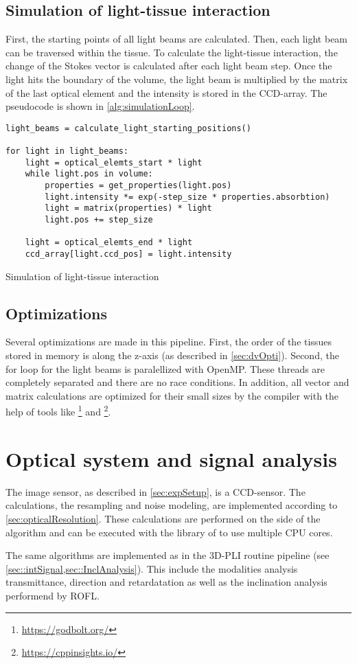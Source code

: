 \subsection{Simulation of light-tissue interaction}
%
First, the starting points of all light beams are calculated.
Then, each light beam can be traversed within the tissue.
To calculate the light-tissue interaction, the change of the Stokes vector is calculated after each light beam step.
Once the light hits the boundary of the volume, the light beam is multiplied by the matrix of the last optical element and the intensity is stored in the \ac{CCD}-array.
The pseudocode is shown in \cref{alg:simulationLoop}.
%
\begin{lstfloat}[!tb]
\lstset{style=python}
\begin{lstlisting}[]
light_beams = calculate_light_starting_positions()

for light in light_beams:
    light = optical_elemts_start * light
    while light.pos in volume:
        properties = get_properties(light.pos)
        light.intensity *= exp(-step_size * properties.absorbtion)
        light = matrix(properties) * light
        light.pos += step_size
   
    light = optical_elemts_end * light
    ccd_array[light.ccd_pos] = light.intensity
\end{lstlisting}
\caption{Simulation of light-tissue interaction}
\label{alg:simulationLoop}
\end{lstfloat}
%
%
%
\subsection{Optimizations}
%
Several optimizations are made in this pipeline.
First, the order of the tissues stored in memory is along the z-axis (as described in \cref{sec:dvOpti}).
Second, the for loop for the light beams is paralellized with \ac{OpenMP}.
These threads are completely separated and there are no race conditions.
In addition, all vector and matrix calculations are optimized for their small sizes by the compiler with the help of tools like \footnote{\url{https://godbolt.org/}} and \footnote{\url{https://cppinsights.io/}}.
%
%
\section{Optical system and signal analysis}
\label{sec:ccdOptic}
%
The image sensor, as described in \cref{sec:expSetup}, is a \ac{CCD}-sensor.
The calculations, \ie the resampling and noise modeling, are implemented according to \cref{sec:opticalResolution}.
These calculations are performed on the \python{} side of the algorithm and can be executed with the  library of \python{} to use multiple \ac{CPU} cores.
\par
%
The same algorithms are implemented as in the \ac{3D-PLI} routine pipeline (see \cref{sec::intSignal,sec::InclAnalysis}).
This include the modalities analysis transmittance, direction and retardatation as well as the inclination analysis performend by \ac{ROFL}.
%
%
%
